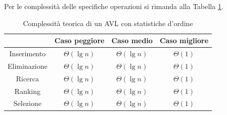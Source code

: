 Per le complessità delle specifiche operazioni si rimanda alla Tabella \ref{tab:complessita_albero_avl}.

\begin{table}[h!]
	\centering
	\begin{tabular}{ |c||c|c|c|  }
		\hhline{~---}
		\multicolumn{1}{c|}{} & Caso peggiore & Caso medio & Caso migliore \\
		\hline
		Inserimento & $\Theta(\lg n)$ & $\Theta(\lg n)$ & $\Theta(1)$\\
		\hline
		Eliminazione & $\Theta(\lg n)$ & $\Theta(\lg n)$ & $\Theta(1)$\\
		\hline
		Ricerca & $\Theta(\lg n)$ & $\Theta(\lg n)$ & $\Theta(1)$\\
		\hline
		Ranking & $\Theta(\lg n)$ & $\Theta(\lg n)$ & $\Theta(1)$\\
		\hline
		Selezione & $\Theta(\lg n)$ & $\Theta(\lg n)$ & $\Theta(1)$\\
		\hline
	\end{tabular}
	\caption{Complessità teorica di un AVL con statistiche d'ordine}
	\label{tab:complessita_albero_avl}
\end{table}
\newpage